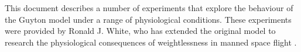 This document describes a number of experiments that explore the behaviour of the Guyton model \cite{Guyton1972} under a range of physiological conditions. These experiments were provided by Ronald J. White, who has extended the original model to research the physiological consequences of weightlessness in manned space flight \cite{White2003,White1998,White1982,White1991}.
